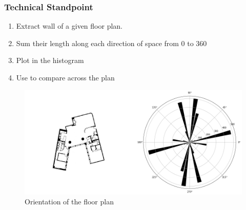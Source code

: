                         \subsubsection{Technical Standpoint}
                                \begin{enumerate}[label=\alph*.]
                                        \item Extract wall of a given floor plan. 
                                        \item Sum their length along each direction of space from 0 to 360 
                                        \item Plot in the histogram
                                        \item Use to compare across the plan
                                \end{enumerate}
                        \begin{figure}[h]
                                \centering
                                \includegraphics[width=1\textwidth]{img/chapter_6/orientation.png}
                                \caption{Orientation of the floor plan}
                                \label{fig: Orientation of the floor plan}
                        \end{figure}
                \pagebreak

